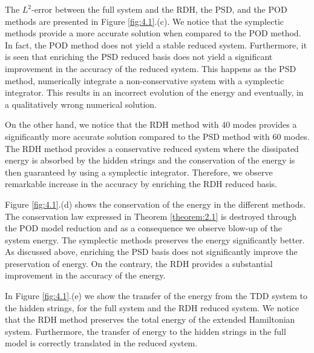 The $L^2$-error between the full system and the RDH, the PSD, and the POD methods are presented in Figure \ref{fig:4.1}.(c). We notice that the symplectic methods provide a more accurate solution when compared to the POD method. In fact, the POD method does not yield a stable reduced system.  Furthermore, it is seen that enriching the PSD reduced basis does not yield a significant improvement in the accuracy of the reduced system. This happens as the PSD method, numerically integrate a non-conservative system with a symplectic integrator. This results in an incorrect evolution of the energy and eventually, in a qualitatively wrong numerical solution.

On the other hand, we notice that the RDH method with 40 modes provides a significantly more accurate solution compared to the PSD method with 60 modes. The RDH method provides a conservative reduced system where the dissipated energy is absorbed by the hidden strings and the conservation of the energy is then guaranteed by using a symplectic integrator. Therefore, we observe remarkable increase in the accuracy by enriching the RDH reduced basis.

Figure \ref{fig:4.1}.(d) shows the conservation of the energy in the different methods. The conservation law expressed in Theorem \ref{theorem:2.1} is destroyed through the POD model reduction and as a consequence we observe blow-up of the system energy. The symplectic methods preserves the energy significantly better. As discussed above, enriching the PSD basis does not significantly improve the preservation of energy. On the contrary, the RDH provides a substantial improvement in the accuracy of the energy.

In Figure \ref{fig:4.1}.(e) we show the transfer of the energy from the TDD system to the hidden strings, for the full system and the RDH reduced system. We notice that the RDH method preserves the total energy of the extended Hamiltonian system. Furthermore, the transfer of energy to the hidden strings in the full model is correctly translated in the reduced system.

